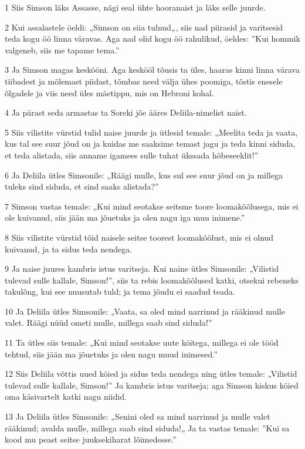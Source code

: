 \par 1 Siis Simson läks Assasse, nägi seal ühte hooranaist ja läks selle juurde.
\par 2 Kui assalastele öeldi: „Simson on siia tulnud„, siis nad piirasid ja varitsesid teda kogu öö linna väravas. Aga nad olid kogu öö rahulikud, öeldes: ”Kui hommik valgeneb, siis me tapame tema.”
\par 3 Ja Simson magas keskööni. Aga keskööl tõusis ta üles, haaras kinni linna värava tiibadest ja mõlemast piidast, tõmbas need välja ühes poomiga, tõstis enesele õlgadele ja viis need üles mäetippu, mis on Hebroni kohal.
\par 4 Ja pärast seda armastas ta Soreki jõe ääres Deliila-nimelist naist.
\par 5 Siis vilistite vürstid tulid naise juurde ja ütlesid temale: „Meelita teda ja vaata, kus tal see suur jõud on ja kuidas me saaksime temast jagu ja teda kinni siduda, et teda alistada, siis anname igamees sulle tuhat ükssada hõbeseeklit!”
\par 6 Ja Deliila ütles Simsonile: „Räägi mulle, kus sul see suur jõud on ja millega tuleks sind siduda, et sind saaks alistada?”
\par 7 Simson vastas temale: „Kui mind seotakse seitsme toore loomakõõlusega, mis ei ole kuivanud, siis jään ma jõuetuks ja olen nagu iga muu inimene.”
\par 8 Siis vilistite vürstid tõid naisele seitse toorest loomakõõlust, mis ei olnud kuivanud, ja ta sidus teda nendega.
\par 9 Ja naise juures kambris istus varitseja. Kui naine ütles Simsonile: „Vilistid tulevad sulle kallale, Simson!”, siis ta rebis loomakõõlused katki, otsekui rebeneks takulõng, kui see nuusutab tuld; ja tema jõudu ei saadud teada.
\par 10 Ja Deliila ütles Simsonile: „Vaata, sa oled mind narrinud ja rääkinud mulle valet. Räägi nüüd ometi mulle, millega saab sind siduda!”
\par 11 Ta ütles siis temale: „Kui mind seotakse uute köitega, millega ei ole tööd tehtud, siis jään ma jõuetuks ja olen nagu muud inimesed.”
\par 12 Siis Deliila võttis uued köied ja sidus teda nendega ning ütles temale: „Vilistid tulevad sulle kallale, Simson!” Ja kambris istus varitseja; aga Simson kiskus köied oma käsivartelt katki nagu niidid.
\par 13 Ja Deliila ütles Simsonile: „Senini oled sa mind narrinud ja mulle valet rääkinud; avalda mulle, millega saab sind siduda!„ Ja ta vastas temale: ”Kui sa kood mu peast seitse juuksekiharat lõimedesse.”
